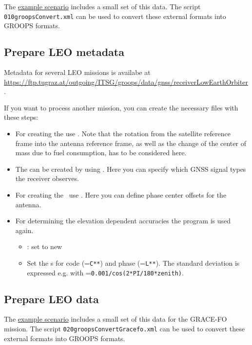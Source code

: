 The \href{https://ftp.tugraz.at/outgoing/ITSG/groops/scenario/scenarioLeoKinematicOrbit.zip}{example scenario} includes a small set of this data.
The script \verb|010groopsConvert.xml| can be used to convert these external formats into GROOPS formats.

\subsection{Prepare LEO metadata}\label{cookbook.kinematicOrbit:leoMetadata}
Metadata for several LEO missions is availabe at \url{https://ftp.tugraz.at/outgoing/ITSG/groops/data/gnss/receiverLowEarthOrbiter}.

If you want to process another mission, you can create the necessary files with these steps:
\begin{itemize}
  \item For creating the  use . Note that the rotation from the
  satellite reference frame into the antenna reference frame, as well as the change of the center of mass due to fuel consumption, has to be considered here.
  \item The  can be created by using . Here you can specify which GNSS signal types the receiver observes.
  \item For creating the \ use . Here you can define phase center offsets for the antenna.
  \item For determining the elevation dependent accuracies the program  is used again.
  \begin{itemize}
    \item {}: set to new
    \item Set the s for code (=\verb|C**|) and phase
    (=\verb|L**|). The standard deviation is expressed e.g. with =\verb|0.001/cos(2*PI/180*zenith)|.
  \end{itemize}
\end{itemize}

\subsection{Prepare LEO data}\label{cookbook.kinematicOrbit:leoData}
The \href{https://ftp.tugraz.at/outgoing/ITSG/groops/scenario/scenarioLeoKinematicOrbit.zip}{example scenario} includes a small set of this data for the GRACE-FO mission.
The script \verb|020groopsConvertGracefo.xml| can be used to convert these external formats into GROOPS formats.

